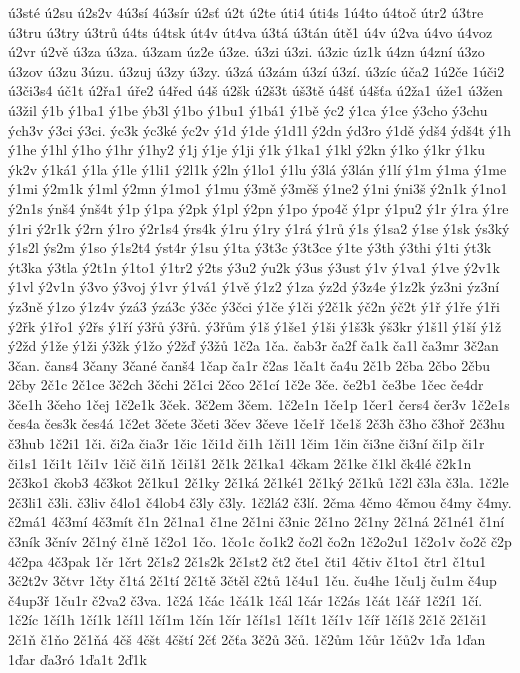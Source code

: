 ú3sté
ú2su
ú2s2v
4ú3sí
4ú3sír
ú2sť
ú2t
ú2te
úti4
úti4s
1ú4to
ú4toč
útr2
ú3tre
ú3tru
ú3try
ú3trů
ú4ts
ú4tsk
út4v
út4va
ú3tá
ú3tán
útě1
ú4v
ú2va
ú4vo
ú4voz
ú2vr
ú2vě
ú3za
ú3za.
ú3zam
úz2e
ú3ze.
ú3zi
ú3zi.
ú3zic
úz1k
ú4zn
ú4zní
ú3zo
ú3zov
ú3zu
3úzu.
ú3zuj
ú3zy
ú3zy.
ú3zá
ú3zám
ú3zí
ú3zí.
ú3zíc
úča2
1ú2če
1úči2
ú3či3s4
úč1t
ú2řa1
úře2
ú4řed
ú4š
ú2šk
ú2š3t
úš3tě
ú4šť
ú4šťa
ú2ža1
úže1
ú3žen
ú3žil
ý1b
ý1ba1
ý1be
ýb3l
ý1bo
ý1bu1
ý1bá1
ý1bě
ýc2
ý1ca
ý1ce
ý3cho
ý3chu
ých3v
ý3ci
ý3ci.
ýc3k
ýc3ké
ýc2v
ý1d
ý1de
ý1d1l
ý2dn
ýd3ro
ý1dě
ýdš4
ýdš4t
ý1h
ý1he
ý1hl
ý1ho
ý1hr
ý1hy2
ý1j
ý1je
ý1ji
ý1k
ý1ka1
ý1kl
ý2kn
ý1ko
ý1kr
ý1ku
ýk2v
ý1ká1
ý1la
ý1le
ý1li1
ý2l1k
ý2ln
ý1lo1
ý1lu
ý3lá
ý3lán
ý1lí
ý1m
ý1ma
ý1me
ý1mi
ý2m1k
ý1ml
ý2mn
ý1mo1
ý1mu
ý3mě
ý3měš
ý1ne2
ý1ni
ýni3š
ý2n1k
ý1no1
ý2n1s
ýnš4
ýnš4t
ý1p
ý1pa
ý2pk
ý1pl
ý2pn
ý1po
ýpo4č
ý1pr
ý1pu2
ý1r
ý1ra
ý1re
ý1ri
ý2r1k
ý2rn
ý1ro
ý2r1s4
ýrs4k
ý1ru
ý1ry
ý1rá
ý1rů
ý1s
ý1sa2
ý1se
ý1sk
ýs3ký
ý1s2l
ýs2m
ý1so
ý1s2t4
ýst4r
ý1su
ý1ta
ý3t3c
ý3t3ce
ý1te
ý3th
ý3thi
ý1ti
ýt3k
ýt3ka
ý3tla
ý2t1n
ý1to1
ý1tr2
ý2ts
ý3u2
ýu2k
ý3us
ý3ust
ý1v
ý1va1
ý1ve
ý2v1k
ý1vl
ý2v1n
ý3vo
ý3voj
ý1vr
ý1vá1
ý1vě
ý1z2
ý1za
ýz2d
ý3z4e
ý1z2k
ýz3ni
ýz3ní
ýz3ně
ý1zo
ý1z4v
ýzá3
ýzá3c
ý3čc
ý3čci
ý1če
ý1či
ý2č1k
ýč2n
ýč2t
ý1ř
ý1ře
ý1ři
ý2řk
ý1řo1
ý2řs
ý1ří
ý3řů
ý3řů.
ý3řům
ý1š
ý1še1
ý1ši
ý1š3k
ýš3kr
ý1š1l
ý1ší
ý1ž
ý2žd
ý1že
ý1ži
ý3žk
ý1žo
ý2žď
ý3žů
1č2a
1ča.
čab3r
ča2f
ča1k
ča1l
ča3mr
3č2an
3čan.
čans4
3čany
3čané
čanš4
1čap
ča1r
č2as
1ča1t
ča4u
2č1b
2čba
2čbo
2čbu
2čby
2č1c
2č1ce
3č2ch
3čchi
2č1ci
2čco
2č1cí
1č2e
3če.
če2b1
če3be
1čec
če4dr
3če1h
3čeho
1čej
1č2e1k
3ček.
3č2em
3čem.
1č2e1n
1če1p
1čer1
čers4
čer3v
1č2e1s
čes4a
čes3k
čes4á
1č2et
3čete
3četi
3čev
3čeve
1če1ř
1če1š
2č3h
č3ho
č3hoř
2č3hu
č3hub
1č2i1
1či.
či2a
čia3r
1čic
1či1d
či1h
1či1l
1čim
1čin
či3ne
či3ní
či1p
či1r
či1s1
1či1t
1či1v
1čič
či1ň
1či1š1
2č1k
2č1ka1
4čkam
2č1ke
č1kl
čk4lé
č2k1n
2č3ko1
čkob3
4č3kot
2č1ku1
2č1ky
2č1ká
2č1ké1
2č1ký
2č1ků
1č2l
č3la
č3la.
1č2le
2č3li1
č3li.
č3liv
č4lo1
č4lob4
č3ly
č3ly.
1č2lá2
č3lí.
2čma
4čmo
4čmou
č4my
č4my.
č2má1
4č3mí
4č3mít
č1n
2č1na1
č1ne
2č1ni
č3nic
2č1no
2č1ny
2č1ná
2č1né1
č1ní
č3ník
3čnív
2č1ný
č1ně
1č2o1
1čo.
1čo1c
čo1k2
čo2l
čo2n
1č2o2u1
1č2o1v
čo2č
č2p
4č2pa
4č3pak
1čr
1črt
2č1s2
2č1s2k
2č1st2
čt2
čte1
čti1
4čtiv
č1to1
čtr1
č1tu1
3č2t2v
3čtvr
1čty
č1tá
2č1tí
2č1tě
3čtěl
č2tů
1č4u1
1ču.
ču4he
1ču1j
ču1m
č4up
č4up3ř
1ču1r
č2va2
č3va.
1č2á
1čác
1čá1k
1čál
1čár
1č2ás
1čát
1čář
1č2í1
1čí.
1č2íc
1čí1h
1čí1k
1čí1l
1čí1m
1čín
1čír
1čí1s1
1čí1t
1čí1v
1číř
1čí1š
2č1č
2č1či1
2č1ň
č1ňo
2č1ňá
4čš
4čšt
4čští
2čť
2čťa
3č2ů
3čů.
1č2ům
1čůr
1čů2v
1ďa
1ďan
1ďar
ďa3ró
1ďa1t
2ď1k
